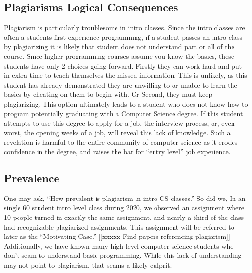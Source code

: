 \documentclass[letterpaper,10pt,conference]{IEEEtran}
\begin{document}
	\subsection{Plagiarisms Logical Consequences}
		Plagiarism is particularly troublesome in intro classes.  Since the intro classes are often a students first experience programming, if a student passes an intro class by plagiarizing it is likely that student does not understand part or all of the course.  Since higher programming courses assume you know the basics, these students have only 2 choices going forward.  Firstly they can work hard and put in extra time to teach themselves the missed information.  This is unlikely, as this student has already demonstrated they are unwilling to or unable to learn the basics by cheating on them to begin with.
		Or Second, they must keep plagiarizing.  This option ultimately leads to a student who does not know how to program potentially graduating with a Computer Science degree.  If this student attempts to use this degree to apply for a job, the interview process, or, even worst, the opening weeks of a job, will reveal this lack of knowledge.  Such a revelation is harmful to the entire community of computer science as it erodes confidence in the degree, and raises the bar for ``entry level'' job experience.
		\subsection{Prevalence}
		 One may ask, ``How prevalent is plagiarism in intro CS classes.'' So did we, In an single 60 student intro level  class during 2020, we observed an assignment where 10 people turned in exactly the same assignment, and nearly a third of the class had recognizable plagiarized assignments.   This assignment will be referred to later as the ``Motivating Case.''
		 [[xxxxx Find papers referencing plagiarism]]
		 Additionally, we have known many high level computer science students who don't seam to understand basic programming.  While this lack of understanding may not point to plagiarism, that seams a likely culprit.
		
\end{document}
